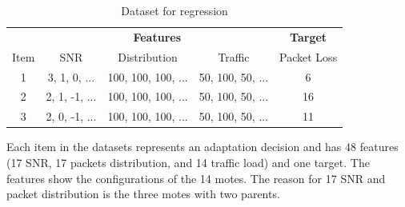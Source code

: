 \documentclass[a4paper,12pt]{article}
\begin{document}
\begin{table}[H]
	\centering
	\begin{tabular}{c|c|c|c|c}
		\hline
		\multicolumn{1}{c|}{} & \multicolumn{3}{c|}{\textbf{Features}} & \multicolumn{1}{c}{\textbf{Target}} \\
		\cline{1-1} \cline{2-4} \cline{5-5}
		\multicolumn{1}{c|}{Item} & \multicolumn{1}{c|}{SNR} & \multicolumn{1}{c|}{Distribution} & \multicolumn{1}{c|}{Traffic} & \multicolumn{1}{c}{Packet Loss} \\
		\cline{1-1} \cline{2-2} \cline{3-3} \cline{4-4} \cline{5-5}
		1 & 3, 1, 0, ... & 100, 100, 100, ... & 50, 100, 50, ... & 6 \\
		\hline
		2 & 2, 1, -1, ... & 100, 100, 100, ... & 50, 100, 50, ... & 16 \\
		\hline
		3 & 2, 0, -1, ... & 100, 100, 100, ... & 50, 100, 50, ... & 11 \\
		\hline
	\end{tabular}
	\caption{Dataset for regression}
	\label{DeltaIoTRegression}
\end{table}
Each item in the datasets represents an adaptation decision and has 48 features (17 SNR, 17 packets distribution, and 14 traffic load) and one target. The features show the configurations of the 14 motes. The reason for 17 SNR and packet distribution is the three motes with two parents.
\end{document}
